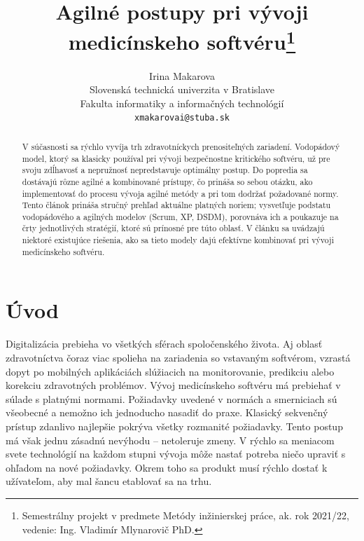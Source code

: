 \documentclass[10pt,twoside,slovak,a4paper]{article}
\title{Agilné postupy pri vývoji medicínskeho softvéru\thanks{Semestrálny projekt v predmete Metódy inžinierskej práce, ak. rok 2021/22, vedenie: Ing. Vladimír Mlynarovič PhD.}}
\author{Irina Makarova\\[2pt]
	{\small Slovenská technická univerzita v Bratislave}\\
	{\small Fakulta informatiky a informačných technológií}\\
	{\small \texttt{xmakarovai@stuba.sk}}
	}
\begin{document}
\maketitle

\begin{abstract}
V súčasnosti sa rýchlo vyvíja trh zdravotníckych prenositeľných zariadení. Vodopádový model, ktorý sa klasicky používal pri vývoji bezpečnostne kritického softvéru, už pre svoju zdĺhavosť a nepružnosť nepredstavuje optimálny postup. Do popredia sa dostávajú rôzne agilné a kombinované prístupy, čo prináša so sebou otázku, ako implementovať do procesu vývoja agilné metódy a pri tom dodržať požadované normy. Tento článok prináša stručný prehľad aktuálne platných noriem; vysvetľuje podstatu vodopádového a agilných modelov (Scrum, XP, DSDM), porovnáva ich a poukazuje na črty jednotlivých stratégií, ktoré sú prínosné pre túto oblasť. V článku sa uvádzajú niektoré existujúce riešenia, ako sa tieto modely dajú efektívne kombinovať pri vývoji medicínskeho softvéru.
\end{abstract}

\section{Úvod} 
Digitalizácia prebieha vo všetkých sférach spoločenského života. Aj oblasť zdravotníctva čoraz viac spolieha na zariadenia so vstavaným softvérom, vzrastá dopyt po mobilných aplikáciách slúžiacich na monitorovanie, predikciu alebo korekciu zdravotných problémov. Vývoj medicínskeho softvéru má prebiehať v súlade s platnými normami. Požiadavky uvedené v normách a smerniciach sú všeobecné a nemožno ich jednoducho nasadiť do praxe. Klasický sekvenčný prístup zdanlivo najlepšie pokrýva všetky rozmanité požiadavky. Tento postup má však jednu zásadnú nevýhodu – netoleruje zmeny. V rýchlo sa meniacom svete technológií na každom stupni vývoja môže nastať potreba niečo upraviť s ohľadom na nové požiadavky. Okrem toho sa produkt musí rýchlo dostať k užívateľom, aby mal šancu etablovať sa na trhu\cite{mchugh2013}. 
\end{document}
